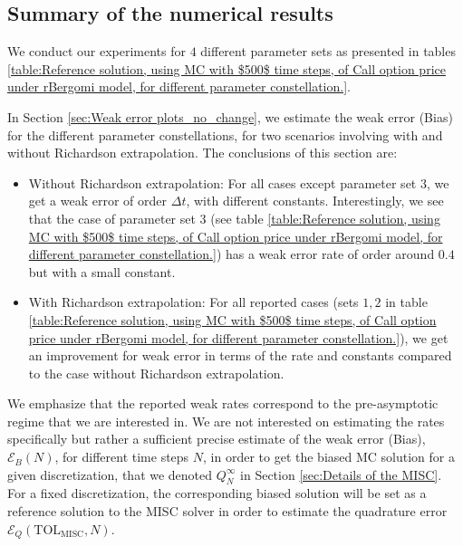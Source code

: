 

\subsection{Summary of the numerical results}

We conduct our experiments for $4$ different parameter  sets as presented in tables \ref{table:Reference solution, using MC with $500$ time steps, of Call option price under rBergomi model, for different parameter constellation.}. 

In Section \ref{sec:Weak error plots_no_change}, we estimate the weak error  (Bias) for the different parameter constellations, for two scenarios involving with and without  Richardson extrapolation. The conclusions of this section are: 
\begin{itemize}
	\item Without Richardson extrapolation: For all cases except parameter set $3$, we get a weak error of order $\Delta t$, with different  constants. Interestingly, we see that the case of parameter set $3$ (see table \ref{table:Reference solution, using MC with $500$ time steps, of Call option price under rBergomi model, for different parameter constellation.}) has a weak error rate of order around $0.4$ but with a small constant. 
	
		\item With Richardson extrapolation: For all reported cases (sets  $1,2$ in table \ref{table:Reference solution, using MC with $500$ time steps, of Call option price under rBergomi model, for different parameter constellation.}), we get an improvement for weak error in terms of the rate and constants compared to the case without Richardson extrapolation.
\end{itemize}

\begin{remark}
We emphasize that the reported weak rates correspond to the pre-asymptotic regime that we are interested in. We are not interested on estimating the rates specifically but rather a sufficient precise estimate of the weak error (Bias), $\mathcal{E}_B(N)$, for different time steps $N$, in order to get the biased MC  solution for a given discretization, that we denoted $Q_N^\infty$ in Section \ref{sec:Details of the MISC}.  For a fixed discretization, the corresponding biased solution will be set as a reference solution to the MISC solver in order to estimate the quadrature error $\mathcal{E}_Q(\text{TOL}_{\text{MISC}},N)$.	
\end{remark}

